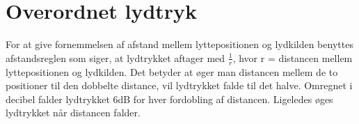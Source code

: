 \section{Overordnet lydtryk}

For at give fornemmelsen af afstand mellem lyttepositionen og lydkilden benyttes afstandsreglen som siger, at lydtrykket aftager med $\frac{1}{r}$, hvor r = distancen mellem lyttepositionen og lydkilden. Det betyder at øger man distancen mellem de to positioner til den dobbelte distance, vil lydtrykket falde til det halve. Omregnet i decibel falder lydtrykket 6dB for hver fordobling af distancen. Ligeledes øges lydtrykket når distancen falder.